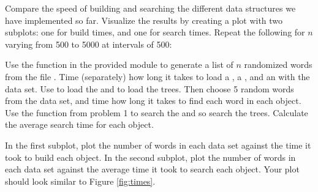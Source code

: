 \begin{problem}
Compare the speed of building and searching the different data structures we have implemented so far.
Visualize the results by creating a plot with two subplots: one for build times, and one for search times.
Repeat the following for $n$ varying from 500 to 5000 at intervals of 500:

Use the  function in the provided  module to generate a list of $n$ randomized words from the file .
Time (separately) how long it takes to load a , a , and an  with the data set.
Use  to load the  and  to load the trees.
Then choose 5 random words from the data set, and time how long it takes to find each word in each object.
Use the  function from problem 1 to search the  and  so search the trees.
Calculate the average search time for each object.

In the first subplot, plot the number of words in each data set against the time it took to build each object.
In the second subplot, plot the number of words in each data set against the average time it took to search each object.
Your plot should look similar to Figure \ref{fig:times}.

\end{problem}


